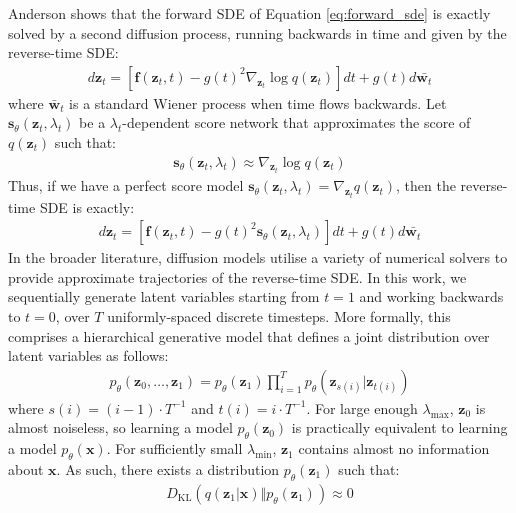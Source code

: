 \documentclass[ oneside,%
                    author={George Herbert},
                    degree={MSci},
                     title={Diffusion Models for Time-Evolving Precipitation Fields},
                  subtitle={}]{dissertation}
\begin{document}
Anderson \cite{Reverse_Time_Diffusion_Anderson} shows that the forward SDE of Equation \ref{eq:forward_sde} is exactly solved by a second diffusion process, running backwards in time and given by the reverse-time SDE:
\begin{align}
      d\mathbf{z}_t=\left[\mathbf{f}(\mathbf{z}_t, t)-g(t)^2\nabla_{\mathbf{z}_t}\log q(\mathbf{z}_t)\right]dt + g(t)d\bar{\mathbf{w}_t}
\end{align}
where $\bar{\mathbf{w}}_t$ is a standard Wiener process when time flows backwards. Let $\mathbf{s}_\theta(\mathbf{z}_t, \lambda_t)$ be a $\lambda_t$-dependent score network \cite{Generative_Modelling_By_Estimating_Gradients_Song} that approximates the score of $q(\mathbf{z}_t)$ such that:
\begin{align}
      \mathbf{s}_\theta(\mathbf{z}_t, \lambda_t)\approx \nabla_{\mathbf{z}_t} \log q(\mathbf{z}_t)\label{eq:score_network}
\end{align}
Thus, if we have a perfect score model $\mathbf{s}_\theta(\mathbf{z}_t, \lambda_t)=\nabla_{\mathbf{z}_t}q(\mathbf{z}_t)$, then the reverse-time SDE is exactly:
\begin{align}
      d\mathbf{z}_t=\left[\mathbf{f}(\mathbf{z}_t, t)-g(t)^2\mathbf{s}_\theta(\mathbf{z}_t, \lambda_t)\right]dt + g(t)d\bar{\mathbf{w}_t}
\end{align}
In the broader literature, diffusion models utilise a variety of numerical solvers to provide approximate trajectories of the reverse-time SDE. In this work, we sequentially generate latent variables starting from $t=1$ and working backwards to $t=0$, over $T$ uniformly-spaced discrete timesteps. More formally, this comprises a hierarchical generative model that defines a joint distribution over latent variables as follows:
\begin{align}
      p_\theta(\mathbf{z}_0,\ldots,\mathbf{z}_1)=p_\theta(\mathbf{z}_1)\prod_{i=1}^T p_\theta(\mathbf{z}_{s(i)}|\mathbf{z}_{t(i)})
\end{align}
where $s(i)=(i - 1)\cdot T^{-1}$ and $t(i)=i\cdot T^{-1}$. For large enough $\lambda_{\max}$, $\mathbf{z}_0$ is almost noiseless, so learning a model $p_\theta(\mathbf{z}_0)$ is practically equivalent to learning a model $p_\theta(\mathbf{x})$. For sufficiently small $\lambda_{\min}$, $\mathbf{z}_1$ contains almost no information about $\mathbf{x}$. As such, there exists a distribution $p_\theta(\mathbf{z}_1)$ such that:
\begin{align}
      D_{\mathrm{KL}}(q(\mathbf{z}_1|\mathbf{x})\Vert p_\theta(\mathbf{z}_1))\approx 0
\end{align}
\end{document}
